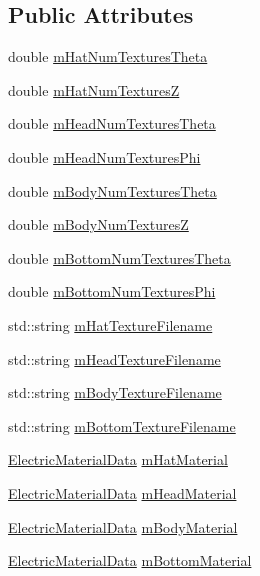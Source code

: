\subsection*{Public Attributes}
\begin{DoxyCompactItemize}
\item 
double \hyperlink{class_lagrangian_racer_render_data_a766230be72d938b14f4d32b8873092d7}{m\-Hat\-Num\-Textures\-Theta}
\item 
double \hyperlink{class_lagrangian_racer_render_data_a89916f65f2bc1eeab2c65305f0a62409}{m\-Hat\-Num\-Textures\-Z}
\item 
double \hyperlink{class_lagrangian_racer_render_data_ab52e4df8e723b61a488a2768eac88b01}{m\-Head\-Num\-Textures\-Theta}
\item 
double \hyperlink{class_lagrangian_racer_render_data_abe81dcbd66023cef6700fbbce1ffbb66}{m\-Head\-Num\-Textures\-Phi}
\item 
double \hyperlink{class_lagrangian_racer_render_data_a8eedbec1f6341500ed483a4cbc32263f}{m\-Body\-Num\-Textures\-Theta}
\item 
double \hyperlink{class_lagrangian_racer_render_data_a4ac17fa4204b5b45e7c4573fab47e0f1}{m\-Body\-Num\-Textures\-Z}
\item 
double \hyperlink{class_lagrangian_racer_render_data_a3c094864539464ee55ac1cd1a23a0219}{m\-Bottom\-Num\-Textures\-Theta}
\item 
double \hyperlink{class_lagrangian_racer_render_data_acdc57178e2512e9ce095d04694d4db87}{m\-Bottom\-Num\-Textures\-Phi}
\item 
std\-::string \hyperlink{class_lagrangian_racer_render_data_a75dd9e75e88e56ca54635f1db909f12f}{m\-Hat\-Texture\-Filename}
\item 
std\-::string \hyperlink{class_lagrangian_racer_render_data_a7fc760725ac25aadfaf58ef4509a62a6}{m\-Head\-Texture\-Filename}
\item 
std\-::string \hyperlink{class_lagrangian_racer_render_data_a4623ba2adca25658d15e7fd82bb4d7d9}{m\-Body\-Texture\-Filename}
\item 
std\-::string \hyperlink{class_lagrangian_racer_render_data_a2c0d76f2379454fd940c0d6f3382cc57}{m\-Bottom\-Texture\-Filename}
\item 
\hyperlink{class_electric_material_data}{Electric\-Material\-Data} \hyperlink{class_lagrangian_racer_render_data_a6d82009be8fdd7688e4560d98cdc41af}{m\-Hat\-Material}
\item 
\hyperlink{class_electric_material_data}{Electric\-Material\-Data} \hyperlink{class_lagrangian_racer_render_data_acbcdead066f265a07ef25a89459a7f06}{m\-Head\-Material}
\item 
\hyperlink{class_electric_material_data}{Electric\-Material\-Data} \hyperlink{class_lagrangian_racer_render_data_aaa522cfd401f27b708a45d1447b0a28f}{m\-Body\-Material}
\item 
\hyperlink{class_electric_material_data}{Electric\-Material\-Data} \hyperlink{class_lagrangian_racer_render_data_a097eaa5144f9f3a43effd0d1901e9bb5}{m\-Bottom\-Material}
\end{DoxyCompactItemize}


